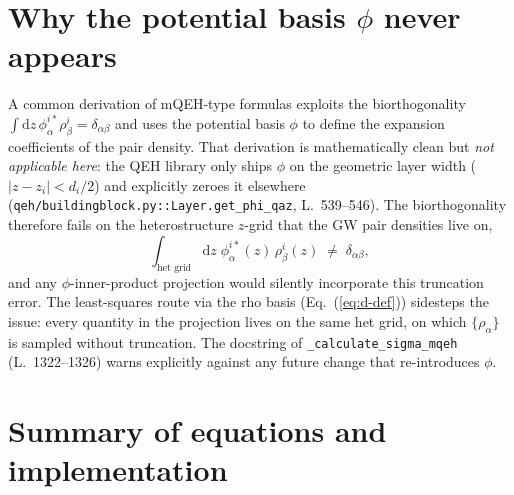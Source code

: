 \documentclass[11pt,a4paper]{article}
\newcommand{\dd}{\mathrm{d}}
\newcommand{\eq}[1]{Eq.~(\ref{eq:#1})}
\begin{document}
\section{Why the potential basis $\phi$ never appears}

A common derivation of mQEH-type formulas exploits the biorthogonality
$\int\dd z\,\phi^{i*}_{\alpha}\rho^{i}_{\beta}=\delta_{\alpha\beta}$
and uses the potential basis $\phi$ to define the expansion
coefficients of the pair density.  That derivation is mathematically
clean but \emph{not applicable here}: the QEH library only ships
$\phi$ on the geometric layer width
($|z-z_i|<d_i/2$) and explicitly zeroes it elsewhere
(\texttt{qeh/buildingblock.py::Layer.get\_phi\_qaz}, L.~539--546).
The biorthogonality therefore fails on the heterostructure $z$-grid
that the GW pair densities live on,
\begin{equation}
\int_{\text{het grid}}\!\dd z\;\phi^{i*}_{\alpha}(z)\,
\rho^{i}_{\beta}(z)\;\neq\;\delta_{\alpha\beta},
\label{eq:biorth-broken}
\end{equation}
and any $\phi$-inner-product projection would silently incorporate
this truncation error.  The least-squares route via the rho basis
(\eq{d-def}) sidesteps the issue: every quantity in the projection
lives on the same het grid, on which $\{\rho_\alpha\}$ is sampled
without truncation.  The docstring of
\texttt{\_calculate\_sigma\_mqeh} (L.~1322--1326) warns explicitly
against any future change that re-introduces $\phi$.

\section{Summary of equations and implementation}
\end{document}
